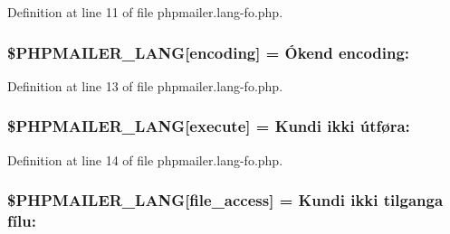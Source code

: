 Definition at line 11 of file phpmailer.\+lang-\/fo.\+php.

\subsubsection[{\texorpdfstring{\$\+P\+H\+P\+M\+A\+I\+L\+E\+R\+\_\+\+L\+A\+NG}{$PHPMAILER_LANG}}]{\setlength{\rightskip}{0pt plus 5cm}\$P\+H\+P\+M\+A\+I\+L\+E\+R\+\_\+\+L\+A\+NG\mbox{[}\textquotesingle{}encoding\textquotesingle{}\mbox{]} = \textquotesingle{}Ókend encoding\+: \textquotesingle{}}\hypertarget{phpmailer_8lang-fo_8php_a817f7283f3d54c970a0c10305cc668cc}{}\label{phpmailer_8lang-fo_8php_a817f7283f3d54c970a0c10305cc668cc}


Definition at line 13 of file phpmailer.\+lang-\/fo.\+php.

\subsubsection[{\texorpdfstring{\$\+P\+H\+P\+M\+A\+I\+L\+E\+R\+\_\+\+L\+A\+NG}{$PHPMAILER_LANG}}]{\setlength{\rightskip}{0pt plus 5cm}\$P\+H\+P\+M\+A\+I\+L\+E\+R\+\_\+\+L\+A\+NG\mbox{[}\textquotesingle{}execute\textquotesingle{}\mbox{]} = \textquotesingle{}Kundi ikki útføra\+: \textquotesingle{}}\hypertarget{phpmailer_8lang-fo_8php_a668217a9563a168f30f2a8548b6ed5a9}{}\label{phpmailer_8lang-fo_8php_a668217a9563a168f30f2a8548b6ed5a9}


Definition at line 14 of file phpmailer.\+lang-\/fo.\+php.

\subsubsection[{\texorpdfstring{\$\+P\+H\+P\+M\+A\+I\+L\+E\+R\+\_\+\+L\+A\+NG}{$PHPMAILER_LANG}}]{\setlength{\rightskip}{0pt plus 5cm}\$P\+H\+P\+M\+A\+I\+L\+E\+R\+\_\+\+L\+A\+NG\mbox{[}\textquotesingle{}file\+\_\+access\textquotesingle{}\mbox{]} = \textquotesingle{}Kundi ikki tilganga fílu\+: \textquotesingle{}}\hypertarget{phpmailer_8lang-fo_8php_a7e83349023b856ef9e5c46e30ae6d51e}{}\label{phpmailer_8lang-fo_8php_a7e83349023b856ef9e5c46e30ae6d51e}


